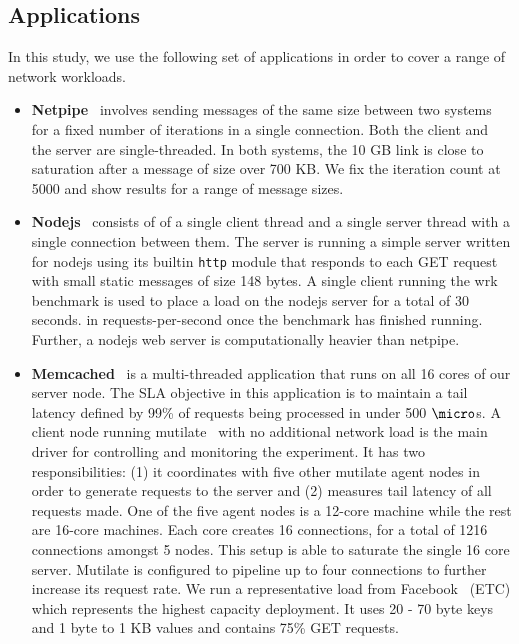 \subsection{Applications}
\label{sec:apps}
In this study, we use the following set of applications in order to cover a
range of network workloads.
\begin{itemize}
\item \textbf{Netpipe}~\cite{snell1996netpipe} involves sending messages of the
same size between two systems for a fixed number of iterations in a single
connection. Both the client and the server are single-threaded. In both
systems, the 10 GB link is close to saturation after a message of size over 700
KB. We fix the iteration count at 5000 and show results for a range of message
sizes.

\item \textbf{Nodejs}~\cite{nodejs} consists of of a single client thread and a
single server thread with a single connection between them. The server is
running a simple server written for nodejs using its builtin \texttt{http}
module that responds to each GET request with small static messages of size 148
bytes. A single client running the wrk~\cite{wrk} benchmark is used to place a
load on the nodejs server for a total of 30 seconds.
in requests-per-second once the benchmark has finished running. Further, a
nodejs web server is computationally heavier than netpipe.

\item \textbf{Memcached}~\cite{mcd} is a multi-threaded application that runs
on all 16 cores of our server node.
The SLA objective in this application is to maintain a tail latency defined by
99\% of requests being processed in under 500 $\micro$s.
A client node running mutilate~\cite{mutilate} with no additional network load
is the main driver for controlling and monitoring the experiment.
It has two responsibilities: (1) it coordinates with five other mutilate agent
nodes in order to generate requests to the server and (2) measures tail latency
of all requests made.
One of the five agent nodes is a 12-core machine while the rest are 16-core
machines. Each core creates 16 connections, for a total of 1216 connections
amongst 5 nodes. This setup is able to saturate the single 16 core server.
Mutilate is configured to pipeline up to four connections to further increase
its request rate.
We run a representative load from Facebook~\cite{workloadanalysisfacebook}
(ETC) which represents the highest capacity deployment. It uses 20 - 70 byte
keys and 1 byte to 1 KB values and contains 75\% GET requests.
	

\end{itemize}
